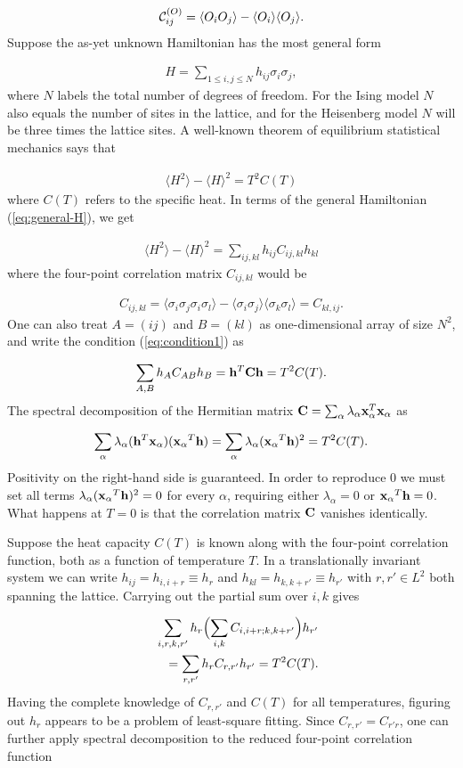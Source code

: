 \documentclass[reprint,amsmath,amssymb,aps,showpacs,superscriptaddress,prb]{revtex4-1}
\newcommand{\ba}{\begin{eqnarray}}
\newcommand{\ea}{\end{eqnarray}}
\newcommand{\nn}{\nonumber \\}
\begin{document}
\ba {\cal C}^{(O)}_{ij} = \langle O_i O_j \rangle - \langle O_i \rangle \langle O_j \rangle. \ea
%
Suppose the as-yet unknown Hamiltonian has the most general form

\ba H= \sum_{1 \le i,j \le N} h_{ij} \sigma_i \sigma_j, \label{eq:general-H} \ea
%
where $N$ labels the total number of degrees of freedom. For the Ising model $N$ also equals the number of sites in the lattice, and for the Heisenberg model $N$ will be three times the lattice sites. A well-known theorem of equilibrium statistical mechanics says that

\ba \langle H^2 \rangle - \langle H \rangle^2 = T^2 C(T) \ea
where $C(T)$ refers to the specific heat. In terms of the general Hamiltonian (\ref{eq:general-H}), we get


\ba \langle H^2 \rangle  - \langle H \rangle^2 = \sum_{ij, kl} h_{ij} C_{ij, kl } h_{kl}  \label{eq:condition1} \ea
where the four-point correlation matrix $C_{ij,kl}$ would be

\ba C_{ij, kl} = \langle \sigma_i \sigma_j \sigma_i \sigma_l \rangle- \langle \sigma_i \sigma_j \rangle \langle \sigma_k \sigma_l \rangle  = C_{kl, ij} . \ea
One can also treat $A=(ij)$ and $B=(kl)$ as one-dimensional array of size $N^2$, and write the condition (\ref{eq:condition1}) as

\ba \sum_{A,B} h_A C_{AB} h_B = {\bf h}^T {\bf C} {\bf h} = T^2 C(T) .\ea
The spectral decomposition of the Hermitian matrix ${\bf C} = \sum_\alpha \lambda_\alpha {\bf x}^T_\alpha {\bf x}_\alpha$ as

\ba \sum_\alpha \lambda_\alpha ({ \bf h}^T {\bf x_\alpha }) ({ \bf x_\alpha }^T {\bf h} ) = \sum_\alpha \lambda_\alpha ({ \bf x_\alpha }^T {\bf h})^2 = T^2 C(T) . \ea
Positivity on the right-hand side is guaranteed. In order to reproduce 0 we must set all terms $\lambda_\alpha  ( {\bf x_\alpha }^T {\bf h} )^2  =0$ for every $\alpha$, requiring either  $\lambda_\alpha = 0$ or ${\bf x_\alpha }^T {\bf h} =0$. What happens at $T=0$ is that the correlation matrix ${\bf C}$ vanishes identically.

Suppose the heat capacity $C(T)$ is known along with the four-point correlation function, both
as a function of temperature $T$. In a translationally invariant system we can write $h_{ij} = h_{i, i+r} \equiv h_{r}$ and $h_{kl} = h_{k,k+r'} \equiv h_{r'} $ with $r,r' \in L^2$ both spanning the lattice. Carrying out the partial sum over $i,k$ gives

\ba & & \sum_{i,r,k,r'} h_{r} \Bigl( \sum_{i,k} C_{i,i+r;k,k+r'} \Bigr)  h_{r'} \nn
& & ~~~  = \sum_{r,r'} h_r C_{r,r'} h_{r'} = T^2 C(T) . \ea
Having the complete knowledge of $C_{r,r'}$ and $C(T)$ for all temperatures, figuring out $h_r$ appears to be a problem of least-square fitting. Since $C_{r,r'} = C_{r'r}$, one can further apply spectral decomposition to the reduced four-point correlation function
\end{document}
